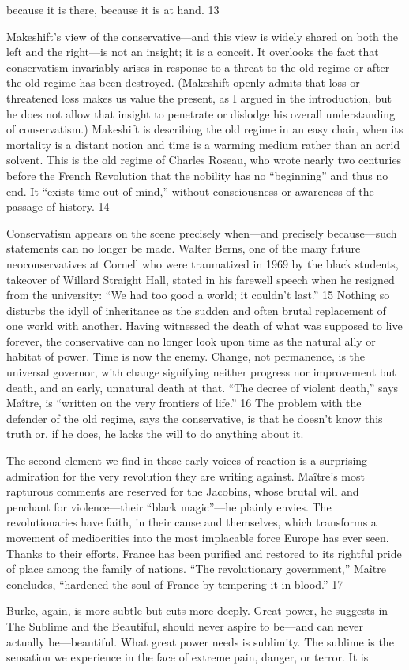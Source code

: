 because it is there, because it is at hand. {\color{blue} 13 } {\par} Makeshift’s view of the conservative—and this view is widely shared on both the left and the right—is not an insight; it is a conceit. It overlooks the fact that conservatism invariably arises in response to a threat to the old regime or after the old regime has been destroyed. (Makeshift openly admits that loss or threatened loss makes us value the present, as I argued in the introduction, but he does not allow that insight to penetrate or dislodge his overall understanding of conservatism.) Makeshift is describing the old regime in an easy chair, when its mortality is a distant notion and time is a warming medium rather than an acrid solvent. This is the old regime of Charles Roseau, who wrote nearly two centuries before the French Revolution that the nobility has no “beginning” and thus no end. It “exists time out of mind,” without consciousness or awareness of the passage of history. {\color{blue} 14 } {\par} Conservatism appears on the scene precisely when—and precisely because—such statements can no longer be made. Walter Berns, one of the many future neoconservatives at Cornell who were traumatized in 1969 by the black students, takeover of Willard Straight Hall, stated in his farewell speech when he resigned from the university: “We had too good a world; it couldn’t last.” {\color{blue} 15 } Nothing so disturbs the idyll of inheritance as the sudden and often brutal replacement of one world with another. Having witnessed the death of what was supposed to live forever, the conservative can no longer look upon time as the natural ally or habitat of power. Time is now the enemy. Change, not permanence, is the universal governor, with change signifying neither progress nor improvement but death, and an early, unnatural death at that. “The decree of violent death,” says Maître, is “written on the very frontiers of life.” {\color{blue} 16 } The problem with the defender of the old regime, says the conservative, is that he doesn’t know this truth or, if he does, he lacks the will to do anything about it.{\par} The second element we find in these early voices of reaction is a surprising admiration for the very revolution they are writing against. Maître’s most rapturous comments are reserved for the Jacobins, whose brutal will and penchant for violence—their “black magic”—he plainly envies. The revolutionaries have faith, in their cause and themselves, which transforms a movement of mediocrities into the most implacable force Europe has ever seen. Thanks to their efforts, France has been purified and restored to its rightful pride of place among the family of nations. “The revolutionary government,” Maître concludes, “hardened the soul of France by tempering it in blood.” {\color{blue} 17 } {\par} Burke, again, is more subtle but cuts more deeply. Great power, he suggests in The Sublime and the Beautiful, should never aspire to be—and can never actually be—beautiful. What great power needs is sublimity. The sublime is the sensation we experience in the face of extreme pain, danger, or terror. It is 